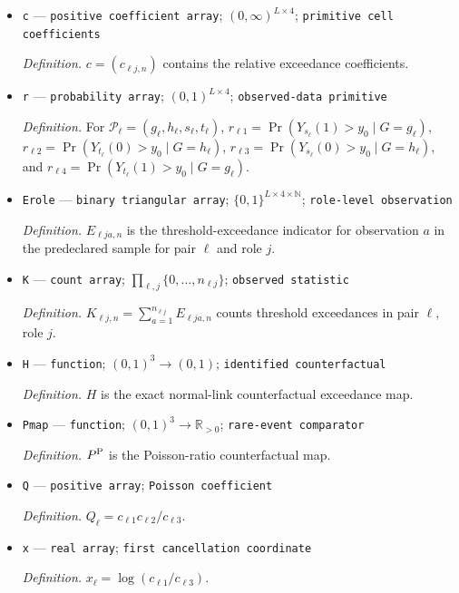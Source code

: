 \documentclass{article}
\begin{document}
\begin{itemize}
  \item \texttt{c} --- \texttt{positive coefficient array}; \((0,\infty)^{L\times4}\); \texttt{primitive cell coefficients}
  \par\smallskip\noindent\emph{Definition.} \(c=(c_{\ell j,n})\) contains the relative exceedance coefficients.
  \item \texttt{r} --- \texttt{probability array}; \((0,1)^{L\times4}\); \texttt{observed-\allowbreak{}data primitive}
  \par\smallskip\noindent\emph{Definition.} For \(\mathcal P_\ell=(g_\ell,h_\ell,s_\ell,t_\ell)\), \(r_{\ell1}=\Pr(Y_{s_\ell}(1)>y_0\mid G=g_\ell)\), \(r_{\ell2}=\Pr(Y_{t_\ell}(0)>y_0\mid G=h_\ell)\), \(r_{\ell3}=\Pr(Y_{s_\ell}(0)>y_0\mid G=h_\ell)\), and \(r_{\ell4}=\Pr(Y_{t_\ell}(1)>y_0\mid G=g_\ell)\).
  \item \texttt{Erole} --- \texttt{binary triangular array}; \(\{0,1\}^{L\times4\times\mathbb N}\); \texttt{role-\allowbreak{}level observation}
  \par\smallskip\noindent\emph{Definition.} \(E_{\ell j a,n}\) is the threshold-exceedance indicator for observation \(a\) in the predeclared sample for pair \(\ell\) and role \(j\).
  \item \texttt{K} --- \texttt{count array}; \(\prod_{\ell,j}\{0,\ldots,n_{\ell j}\}\); \texttt{observed statistic}
  \par\smallskip\noindent\emph{Definition.} \(K_{\ell j,n}=\sum_{a=1}^{n_{\ell j}}E_{\ell j a,n}\) counts threshold exceedances in pair \(\ell\), role \(j\).
  \item \texttt{H} --- \texttt{function}; \((0,1)^3\to(0,1)\); \texttt{identified counterfactual}
  \par\smallskip\noindent\emph{Definition.} \(H\) is the exact normal-link counterfactual exceedance map.
  \item \texttt{Pmap} --- \texttt{function}; \((0,1)^3\to\mathbb R_{>0}\); \texttt{rare-\allowbreak{}event comparator}
  \par\smallskip\noindent\emph{Definition.} \(P^{\rm P}\) is the Poisson-ratio counterfactual map.
  \item \texttt{Q} --- \texttt{positive array}; \texttt{Poisson coefficient}
  \par\smallskip\noindent\emph{Definition.} \(Q_{\ell}=c_{\ell1}c_{\ell2}/c_{\ell3}\).
  \item \texttt{x} --- \texttt{real array}; \texttt{first cancellation coordinate}
  \par\smallskip\noindent\emph{Definition.} \(x_{\ell}=\log(c_{\ell1}/c_{\ell3})\).

\end{itemize}
\end{document}

